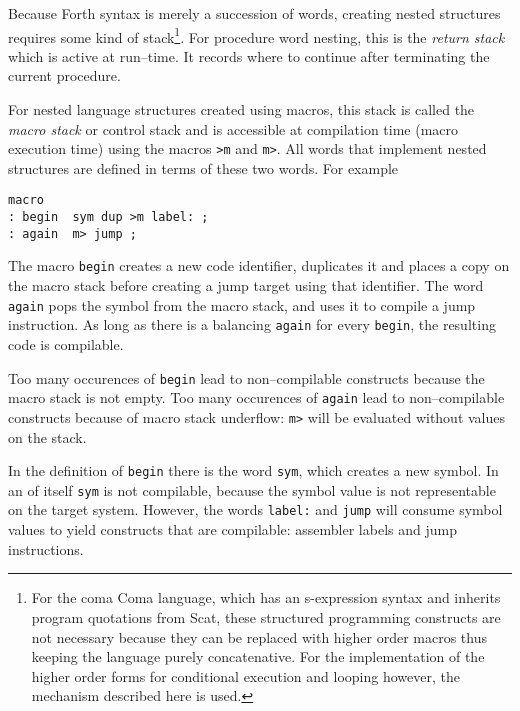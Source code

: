 \documentclass[12pt]{article}
\begin{document}
Because Forth syntax is merely a succession of words, creating nested
structures requires some kind of stack\footnote{For the coma Coma
  language, which has an s-expression syntax and inherits program
  quotations from Scat, these structured programming constructs are
  not necessary because they can be replaced with higher order macros
  thus keeping the language purely concatenative. For the
  implementation of the higher order forms for conditional execution
  and looping however, the mechanism described here is used.}. For
procedure word nesting, this is the \emph{return stack} which is
active at run--time. It records where to continue after terminating
the current procedure.

For nested language structures created using macros, this stack is
called the \emph{macro stack} or control stack and is accessible at
compilation time (macro execution time) using the macros \verb|>m| and
\verb|m>|. All words that implement nested structures are defined in
terms of these two words. For example
\begin{verbatim}
macro
: begin  sym dup >m label: ;
: again  m> jump ;
\end{verbatim}
The macro \verb|begin| creates a new code identifier, duplicates it
and places a copy on the macro stack before creating a jump target
using that identifier. The word \verb|again| pops the symbol from the
macro stack, and uses it to compile a jump instruction. As long as
there is a balancing \verb|again| for every \verb|begin|, the
resulting code is compilable.

Too many occurences of \verb|begin| lead to non--compilable constructs
because the macro stack is not empty.  Too many occurences of
\verb|again| lead to non--compilable constructs because of macro stack
underflow: \verb|m>| will be evaluated without values on the stack.

In the definition of \verb|begin| there is the word \verb|sym|, which
creates a new symbol. In an of itself \verb|sym| is not compilable,
because the symbol value is not representable on the target
system. However, the words \verb|label:| and \verb|jump| will consume
symbol values to yield constructs that are compilable: assembler
labels and jump instructions.
\end{document}
